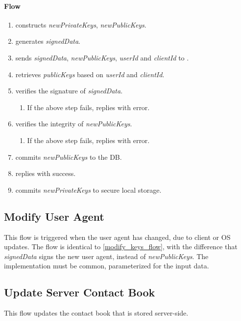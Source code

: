 \documentclass[a4paper,10pt]{article}
\newcommand{\signedData}{\emph{signedData}}
\newcommand{\newPublicKeys}{\emph{newPublicKeys}}
\newcommand{\newPrivateKeys}{\emph{newPrivateKeys}}
\newcommand{\publicKeys}{\emph{publicKeys}}
\newcommand{\userId}{\emph{userId}}
\newcommand{\clientId}{\emph{clientId}}
\begin{document}
\paragraph{Flow}

\begin{enumerate}
 \item \Client{} constructs \newPrivateKeys{}, \newPublicKeys{}.
 \item \Client{} generates \signedData{}.
 \item \Client{} sends \signedData{}, \newPublicKeys{}, \userId{} and \clientId{} to \Server{}.
 \item \Server{} retrieves \publicKeys{} based on \userId{} and \clientId{}.
 \item \Server{} verifies the signature of \signedData{}.
 \begin{enumerate}
  \item If the above step fails, \Server{} replies with error.
 \end{enumerate}
 \item \Server{} verifies the integrity of \newPublicKeys{}.
 \begin{enumerate}
  \item If the above step fails, \Server{} replies with error.
 \end{enumerate}
 \item \Server{} commits \newPublicKeys{} to the DB.
 \item \Server{} replies with success.
 \item\label{modify_keys_flow:local_storage} \Client{} commits \newPrivateKeys{} to secure local storage.
\end{enumerate}

\subsection{Modify User Agent}
\label{modify_user_agent_flow}
This flow is triggered when the user agent has changed, due to client or OS updates. The flow is identical to \ref{modify_keys_flow}, with the difference that \signedData{} 
signs the new user agent, instead of \newPublicKeys{}. The implementation must be common, parameterized for the input data.

\subsection{Update Server Contact Book}
This flow updates the contact book that is stored server-side.
\end{document}
